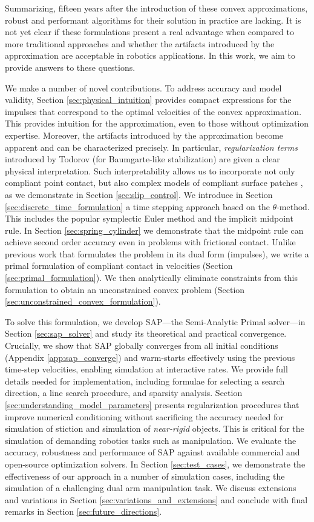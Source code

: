 Summarizing, fifteen years after the introduction of these convex
approximations, robust and performant algorithms for their solution in practice
are lacking. It is not yet clear if these formulations present
a real advantage when compared to more traditional approaches and whether the
artifacts introduced by the approximation are acceptable in robotics
applications. In this work, we aim to provide answers to these questions. 

We make a number of novel contributions. To address accuracy and model validity,
Section \ref{sec:physical_intuition} provides compact expressions for the
impulses that correspond to the optimal velocities of the convex approximation.
This provides intuition for the approximation, even to those without
optimization expertise. Moreover, the artifacts introduced by the approximation
become apparent and can be characterized precisely. In particular,
\emph{regularization terms} introduced by Todorov \cite{bib:todorov2014} (for
Baumgarte-like stabilization) are given a clear physical interpretation. Such
interpretability  allows us to incorporate not only compliant point contact, but
also complex models of compliant surface patches \cite{bib:elandt2019pressure},
as we demonstrate in Section \ref{sec:slip_control}. We introduce in Section
\ref{sec:discrete_time_formulation} a time stepping approach based on the
$\theta\text{-method}$. This includes the popular symplectic Euler method and
the implicit midpoint rule. In Section \ref{sec:spring_cylinder} we demonstrate
that the midpoint rule can achieve second order accuracy even in problems with
frictional contact.
Unlike previous work \cite{bib:anitescu2010,bib:todorov2014} that formulates the
problem in its dual form (impulses), we write a primal formulation of compliant contact
in velocities (Section \ref{sec:primal_formulation}).
We then analytically eliminate constraints from this
formulation to obtain an unconstrained convex problem
(Section \ref{sec:unconstrained_convex_formulation}).

To solve this formulation, we develop SAP---the Semi-Analytic Primal solver---in
Section \ref{sec:sap_solver} and study its theoretical and practical
convergence.  Crucially, we show that SAP globally converges from all initial
conditions (Appendix \ref{app:sap_converge}) and warm-starts effectively
using the previous time-step velocities, enabling simulation at interactive rates.
We provide full details needed for implementation,
including formulae for selecting a search direction,
a line search procedure, and sparsity analysis. Section
\ref{sec:understanding_model_parameters} presents 
regularization procedures that improve numerical
conditioning without sacrificing the accuracy needed
for simulation of stiction and simulation of \emph{near-rigid} objects.
This is critical for the simulation of demanding robotics tasks such as
manipulation. We evaluate the accuracy, robustness and performance of SAP
against available commercial and open-source optimization solvers. In Section
\ref{sec:test_cases}, we demonstrate the effectiveness of our approach in a
number of simulation cases, including the simulation of a challenging dual arm
manipulation task. We discuss extensions and variations in Section
\ref{sec:variations_and_extensions} and conclude with final remarks in Section
\ref{sec:future_directions}.
